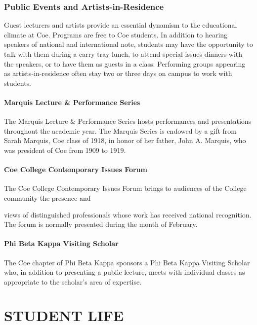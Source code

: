 \documentclass[
  letterpaper,
]{scrbook}
\begin{document}
\subsection{Public Events and
Artists-in-Residence}\label{public-events-and-artists-in-residence}

Guest lecturers and artists provide an essential dynamism to the
educational climate at Coe. Programs are free to Coe students. In
addition to hearing speakers of national and international note,
students may have the opportunity to talk with them during a carry tray
lunch, to attend special issues dinners with the speakers, or to have
them as guests in a class. Performing groups appearing as
artists-in-residence often stay two or three days on campus to work with
students.

\subsubsection{Marquis Lecture \& Performance
Series}\label{marquis-lecture-performance-series}

The Marquis Lecture \& Performance Series hosts performances and
presentations throughout the academic year. The Marquis Series is
endowed by a gift from Sarah Marquis, Coe class of 1918, in honor of her
father, John A. Marquis, who was president of Coe from 1909 to 1919.

\subsubsection{Coe College Contemporary Issues
Forum}\label{coe-college-contemporary-issues-forum}

The Coe College Contemporary Issues Forum brings to audiences of the
College community the presence and

views of distinguished professionals whose work has received national
recognition. The forum is normally presented during the month of
February.

\subsubsection{Phi Beta Kappa Visiting
Scholar}\label{phi-beta-kappa-visiting-scholar}

The Coe chapter of Phi Beta Kappa sponsors a Phi Beta Kappa Visiting
Scholar who, in addition to presenting a public lecture, meets with
individual classes as appropriate to the scholar's area of expertise.

\chapter{STUDENT LIFE}\label{student-life}
\end{document}
